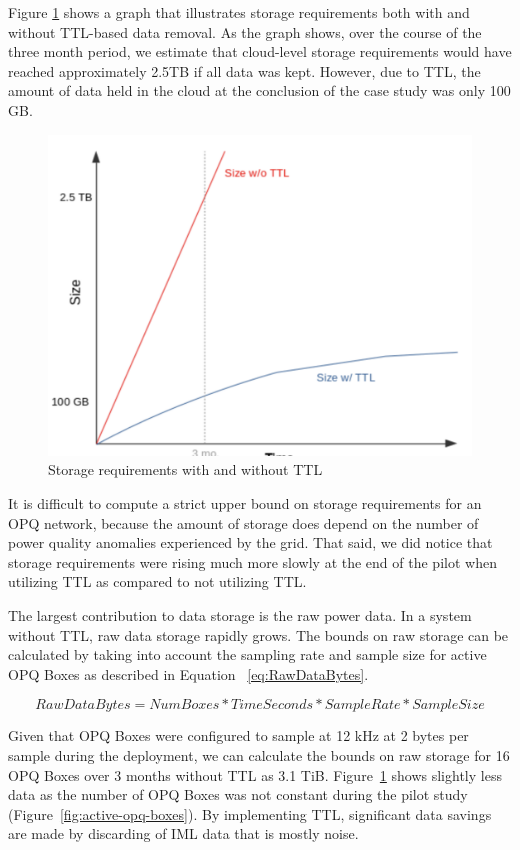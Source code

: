 Figure \ref{fig:data-management-graph} shows a graph that illustrates storage requirements both with and without TTL-based data removal.  As the graph shows, over the course of the three month period, we estimate that cloud-level storage requirements would have reached approximately 2.5TB if all data was kept.  However, due to TTL, the amount of data held in the cloud at the conclusion of the case study was only 100 GB.

\begin{figure}[ht]
  \centering
	\includegraphics[width=0.4\linewidth]{images/pilot/data-management-graph.png}
	\caption{Storage requirements with and without TTL}
	\label{fig:data-management-graph}
\end{figure}

It is difficult to compute a strict upper bound on storage requirements for an OPQ network, because the amount of storage does depend on the number of power quality anomalies experienced by the grid. That said, we did notice that storage requirements were rising much more slowly at the end of the pilot when utilizing TTL as compared to not utilizing TTL.

The largest contribution to data storage is the raw power data. In a system without TTL, raw data storage rapidly grows. The bounds on raw storage can be calculated by taking into account the sampling rate and sample size for active OPQ Boxes as described in Equation ~\ref{eq:RawDataBytes}.

\begin{equation}
    RawDataBytes = NumBoxes * TimeSeconds * SampleRate * SampleSize
    \label{eq:RawDataBytes}
\end{equation}

Given that OPQ Boxes were configured to sample at 12 kHz at 2 bytes per sample during the deployment, we can calculate the bounds on raw storage for 16 OPQ Boxes over 3 months without TTL as 3.1 TiB. Figure~\ref{fig:data-management-graph} shows slightly less data as the number of OPQ Boxes was not constant during the pilot study (Figure~\ref{fig:active-opq-boxes}). By implementing TTL, significant data savings are made by discarding of IML data that is mostly noise.

